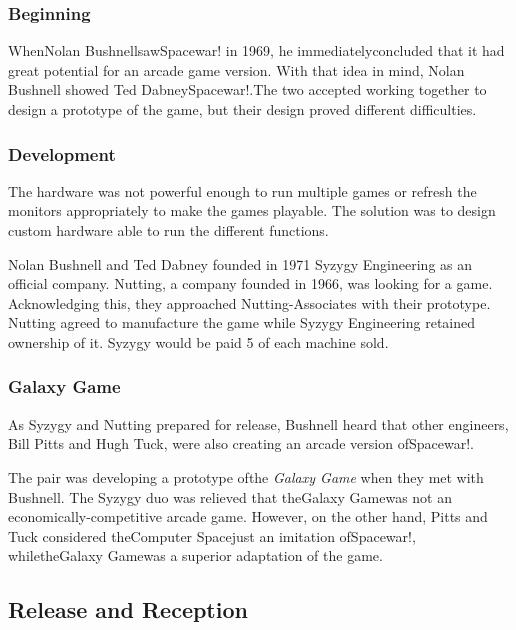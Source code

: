 \documentclass[a4paper,10pt]{book}
\begin{document}
 \subsubsection{Beginning }
 
            WhenNolan BushnellsawSpacewar! in 1969, he immediatelyconcluded that it had great potential for an arcade game version. With that idea in mind, Nolan Bushnell showed Ted DabneySpacewar!.The two accepted working together to design a prototype of the game, but their design proved different difficulties.
           
 \subsubsection{Development }
 
            The hardware was not powerful enough to run multiple games or refresh the monitors appropriately to make the games playable. The solution was to design custom hardware able to run the different functions.
           
 
            Nolan Bushnell and Ted Dabney founded in 1971 Syzygy Engineering as an official company. Nutting, a company founded in 1966, was looking for a game. Acknowledging this, they approached Nutting-Associates with their prototype. 
            Nutting agreed to manufacture the game while Syzygy Engineering retained ownership of it. Syzygy would be paid 5 of each machine sold.
           
 \subsubsection{Galaxy Game }
 
            As Syzygy and Nutting prepared for release, Bushnell heard that other engineers, Bill Pitts and Hugh Tuck, were also creating an arcade version ofSpacewar!.
           
 
            The pair was developing a prototype ofthe  \textit{Galaxy Game }when they met with Bushnell.  
            The Syzygy duo was relieved that theGalaxy Gamewas not an economically-competitive arcade game.  
            However, on the other hand, Pitts and Tuck considered theComputer Spacejust an imitation ofSpacewar!, whiletheGalaxy Gamewas a superior adaptation of the game.
           
 
 \subsection{Release and Reception }
 
\end{document}
